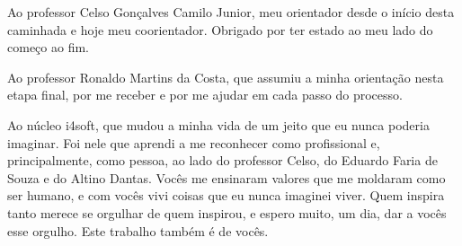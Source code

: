 \begin{agradecimentos}
Ao professor Celso Gonçalves Camilo Junior, meu orientador desde o início desta caminhada e hoje meu coorientador. Obrigado por ter estado ao meu lado do começo ao fim.

Ao professor Ronaldo Martins da Costa, que assumiu a minha orientação nesta etapa final, por me receber e por me ajudar em cada passo do processo.

Ao núcleo i4soft, que mudou a minha vida de um jeito que eu nunca poderia imaginar. Foi nele que aprendi a me reconhecer como profissional e, principalmente, como pessoa, ao lado do professor Celso, do Eduardo Faria de Souza e do Altino Dantas. Vocês me ensinaram valores que me moldaram como ser humano, e com vocês vivi coisas que eu nunca imaginei viver. Quem inspira tanto merece se orgulhar de quem inspirou, e espero muito, um dia, dar a vocês esse orgulho. Este trabalho também é de vocês.
\end{agradecimentos}
